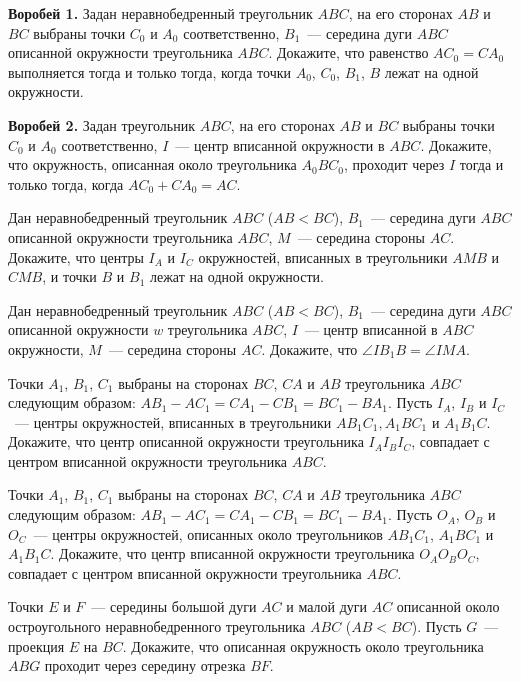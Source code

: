 \begin{problems}

\item\textbf{Воробей 1.}
Задан неравнобедренный треугольник $ABC$, на его сторонах $AB$ и $BC$ выбраны
точки $C_0$ и $A_0$ соответственно,
$B_1$~--- середина дуги $ABC$ описанной окружности треугольника $ABC$.
Докажите, что равенство $A C_0 = C A_0$ выполняется тогда и только тогда, когда
точки $A_0$, $C_0$, $B_1$, $B$ лежат на одной окружности.

\item\textbf{Воробей 2.}
Задан треугольник $ABC$, на его сторонах $AB$ и $BC$ выбраны точки $C_0$ и
$A_0$ соответственно,
$I$~--- центр вписанной окружности в $ABC$.
Докажите, что окружность, описанная около треугольника $A_0 B C_0$, проходит
через $I$ тогда и только тогда, когда $A C_0 + C A_0 = AC$.

\item
Дан неравнобедренный треугольник $ABC$ ($AB < BC$),
$B_1$~--- середина дуги $ABC$ описанной окружности треугольника $ABC$,
$M$~--- середина стороны $AC$.
Докажите, что центры $I_A$ и $I_C$ окружностей, вписанных в треугольники $AMB$
и $CMB$, и точки $B$ и $B_1$ лежат на одной окружности.

\item
Дан неравнобедренный треугольник $ABC$ ($AB < BC$),
$B_1$~--- середина дуги $ABC$ описанной окружности $w$ треугольника $ABC$,
$I$~--- центр вписанной в $ABC$ окружности,
$M$~--- середина стороны $AC$.
Докажите, что $\angle I B_1 B = \angle IMA$.

\item
Точки $A_1$, $B_1$, $C_1$ выбраны на сторонах $BC$, $CA$ и $AB$ треугольника
$ABC$ следующим образом:
$A B_1 - A C_1 = C A_1 - C B_1 = B C_1 - B A_1$.
Пусть $I_A$, $I_B$ и $I_C$~--- центры окружностей, вписанных в треугольники
$A B_1 C_1, A_1 B C_1$ и $A_1 B_1 C$.
Докажите, что центр описанной окружности треугольника $I_A I_B I_C$,
совпадает с центром вписанной окружности треугольника $ABC$.

\item
Точки $A_1$, $B_1$, $C_1$ выбраны на сторонах $BC$, $CA$ и $AB$ треугольника
$ABC$ следующим образом: $A B_1 - A C_1 = C A_1 - C B_1 = B C_1 - B A_1$.
Пусть $O_A$, $O_B$ и $O_C$~--- центры окружностей, описанных около
треугольников $A B_1 C_1$, $A_1 B C_1$ и $A_1 B_1 C$.
Докажите, что центр вписанной окружности треугольника $O_A O_B O_C$,
совпадает с центром вписанной окружности треугольника $ABC$.

\item
Точки $E$ и $F$~--- середины большой дуги $AC$ и малой дуги $AC$ описанной около
остроугольного неравнобедренного треугольника $ABC$ ($AB < BC$).
Пусть $G$~--- проекция $E$ на $BC$.
Докажите, что описанная окружность около треугольника $ABG$ проходит через
середину отрезка $BF$.


\end{problems}
